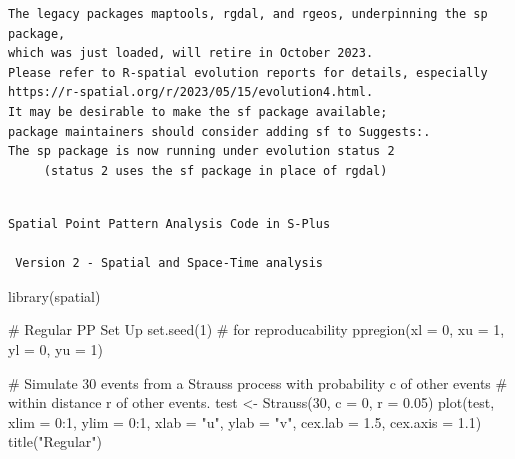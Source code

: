 \documentclass[
  letterpaper,
  DIV=11,
  numbers=noendperiod]{scrartcl}
\newenvironment{Shaded}{\begin{snugshade}}{\end{snugshade}}
\newcommand{\AttributeTok}[1]{\textcolor[rgb]{0.40,0.45,0.13}{#1}}
\newcommand{\CommentTok}[1]{\textcolor[rgb]{0.37,0.37,0.37}{#1}}
\newcommand{\DecValTok}[1]{\textcolor[rgb]{0.68,0.00,0.00}{#1}}
\newcommand{\FloatTok}[1]{\textcolor[rgb]{0.68,0.00,0.00}{#1}}
\newcommand{\FunctionTok}[1]{\textcolor[rgb]{0.28,0.35,0.67}{#1}}
\newcommand{\NormalTok}[1]{\textcolor[rgb]{0.00,0.23,0.31}{#1}}
\newcommand{\OtherTok}[1]{\textcolor[rgb]{0.00,0.23,0.31}{#1}}
\newcommand{\SpecialCharTok}[1]{\textcolor[rgb]{0.37,0.37,0.37}{#1}}
\newcommand{\StringTok}[1]{\textcolor[rgb]{0.13,0.47,0.30}{#1}}
\begin{document}
\begin{verbatim}
The legacy packages maptools, rgdal, and rgeos, underpinning the sp package,
which was just loaded, will retire in October 2023.
Please refer to R-spatial evolution reports for details, especially
https://r-spatial.org/r/2023/05/15/evolution4.html.
It may be desirable to make the sf package available;
package maintainers should consider adding sf to Suggests:.
The sp package is now running under evolution status 2
     (status 2 uses the sf package in place of rgdal)
\end{verbatim}

\begin{verbatim}

Spatial Point Pattern Analysis Code in S-Plus
 
 Version 2 - Spatial and Space-Time analysis
\end{verbatim}

\begin{Shaded}
\begin{Highlighting}[]
\FunctionTok{library}\NormalTok{(spatial)}

\CommentTok{\# Regular PP Set Up}
\FunctionTok{set.seed}\NormalTok{(}\DecValTok{1}\NormalTok{) }\CommentTok{\# for reproducability}
\FunctionTok{ppregion}\NormalTok{(}\AttributeTok{xl =} \DecValTok{0}\NormalTok{, }\AttributeTok{xu =} \DecValTok{1}\NormalTok{, }\AttributeTok{yl =} \DecValTok{0}\NormalTok{, }\AttributeTok{yu =} \DecValTok{1}\NormalTok{)}

\CommentTok{\# Simulate 30 events from a Strauss process with probability c of other events}
\CommentTok{\# within distance r of other events.}
\NormalTok{test }\OtherTok{\textless{}{-}} \FunctionTok{Strauss}\NormalTok{(}\DecValTok{30}\NormalTok{, }\AttributeTok{c =} \DecValTok{0}\NormalTok{, }\AttributeTok{r =} \FloatTok{0.05}\NormalTok{)}
\FunctionTok{plot}\NormalTok{(test, }\AttributeTok{xlim =} \DecValTok{0}\SpecialCharTok{:}\DecValTok{1}\NormalTok{, }\AttributeTok{ylim =} \DecValTok{0}\SpecialCharTok{:}\DecValTok{1}\NormalTok{, }\AttributeTok{xlab =} \StringTok{"u"}\NormalTok{, }\AttributeTok{ylab =} \StringTok{"v"}\NormalTok{, }\AttributeTok{cex.lab =} \FloatTok{1.5}\NormalTok{, }\AttributeTok{cex.axis =} \FloatTok{1.1}\NormalTok{)}
\FunctionTok{title}\NormalTok{(}\StringTok{"Regular"}\NormalTok{)}
\end{Highlighting}
\end{Shaded}
\end{document}
